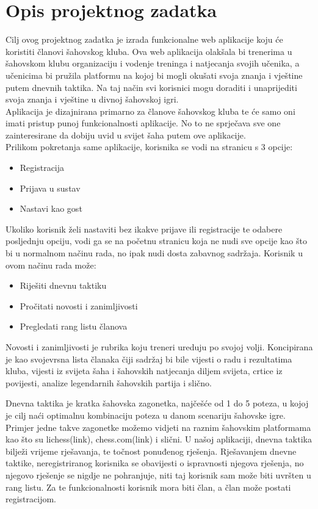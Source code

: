 \documentclass{article}
\begin{document}
	\eject
	
	\section{Opis projektnog zadatka}
		Cilj ovog projektnog zadatka je izrada funkcionalne web aplikacije koju će koristiti članovi šahovskog kluba. Ova web aplikacija olakšala bi trenerima u šahovskom klubu organizaciju i vodenje treninga i natjecanja svojih učenika, a učenicima bi pružila platformu na kojoj bi mogli okušati svoja znanja i vještine putem dnevnih taktika. Na taj način svi korisnici mogu doraditi i unaprijediti svoja znanja i vještine u divnoj šahovskoj igri. \\ 
		Aplikacija je dizajnirana primarno za članove šahovskog kluba te će samo oni imati pristup punoj funkcionalnosti aplikacije. No to ne sprječava sve one zainteresirane da dobiju uvid u svijet šaha putem ove aplikacije. \\
		Prilikom pokretanja same aplikacije, korisnika se vodi na stranicu s 3 opcije:
		\begin{itemize}
			\item Registracija
			\item Prijava u sustav
			\item  Nastavi kao gost
		\end{itemize}
		Ukoliko korisnik želi nastaviti bez ikakve prijave ili registracije te odabere posljednju opciju, vodi ga se na početnu stranicu koja ne nudi sve opcije kao što bi u normalnom načinu rada, no ipak nudi dosta zabavnog sadržaja. Korisnik u ovom načinu rada može:
		\begin{itemize}
			\item Riješiti dnevnu taktiku 
			\item Pročitati novosti i zanimljivosti 
			\item Pregledati rang listu članova 
		\end{itemize}
		Novosti i zanimljivosti je rubrika koju treneri ureduju po svojoj volji. Koncipirana je kao svojevrsna lista članaka čiji sadržaj bi bile vijesti o radu i rezultatima kluba, vijesti iz svijeta šaha i šahovskih natjecanja diljem svijeta, crtice iz povijesti, analize legendarnih šahovskih partija i slično. 
		
		Dnevna taktika je kratka šahovska zagonetka, najčešće od 1 do 5 poteza, u kojoj je cilj naći optimalnu kombinaciju poteza u danom scenariju šahovske igre. Primjer jedne takve zagonetke možemo vidjeti na raznim šahovskim platformama kao što su lichess(link), chess.com(link) i slični. U našoj aplikaciji, dnevna taktika bilježi vrijeme rješavanja, te točnost ponuđenog rješenja. Rješavanjem dnevne taktike, neregistriranog korisnika se obavijesti o ispravnosti njegova rješenja, no njegovo rješenje se nigdje ne pohranjuje, niti taj korisnik sam može biti uvršten u rang listu. Za te funkcionalnosti korisnik mora biti član, a član može postati registracijom.\\
		
\end{document}
